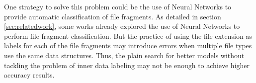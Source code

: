 One strategy to solve this problem could be the use of Neural Networks \cite{} to provide automatic classification of file fragments. As detailed in section \ref{sec:relatedwork}, some works already explored the use of Neural Networks to perform file fragment classification. But the practice of using the file extension as labels for each of the file fragments may introduce errors when multiple file types use the same data structures. Thus, the plain search for better models without tackling the problem of inner data labeling may not be enough to achieve higher accuracy results.